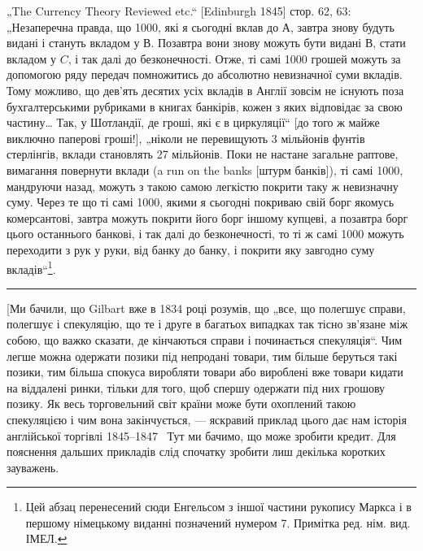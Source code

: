 „The Currency Theory Reviewed etc.“ [Edinburgh 1845] стор. 62, 63: „Незаперечна правда, що 1000, які я сьогодні вклав до $А$, завтра
знову будуть видані і стануть вкладом у $В$. Позавтра вони знову можуть бути
видані $В$, стати вкладом у $C$, і так далі до безконечності. Отже, ті самі
1000 грошей можуть за допомогою ряду передач помножитись до абсолютно невизначної
суми вкладів. Тому можливо, що дев’ять десятих усіх вкладів в Англії зовсім не існують поза
бухгалтерськими рубриками
в книгах банкірів, кожен з яких відповідає за свою частину\dots{} Так, у Шотландії, де гроші, які є в
циркуляції“ [до того ж майже виключно паперові гроші!],
„ніколи не перевищують 3 мільйонів фунтів стерлінгів, вклади становлять 27 мільйонів.
Поки не настане загальне раптове, вимагання повернути вклади (a run
on the banks [штурм банків]), ті самі 1000, мандруючи
назад, можуть з такою самою легкістю покрити таку ж невизначну суму.
Через те що ті самі 1000, якими я сьогодні покриваю свій
борг якомусь комерсантові, завтра можуть покрити його борг іншому купцеві,
а позавтра борг цього останнього банкові, і так далі до безконечності, то ті ж
самі 1000 можуть переходити з рук у руки, від банку до
банку, і покрити яку завгодно суму вкладів“\footnote*{
Цей абзац перенесений сюди Енгельсом з іншої частини рукопису Маркса і в першому німецькому
виданні позначений нумером 7. Примітка ред. нім. вид. ІМЕЛ.
}.

\pfbreak{}

[Ми бачили, що Gilbart вже в 1834 році розумів, що „все,
що полегшує справи, полегшує і спекуляцію, що те і друге
в багатьох випадках так тісно зв’язане між собою, що важко
сказати, де кінчаються справи і починається спекуляція“. Чим
легше можна одержати позики під непродані товари, тим більше
беруться такі позики, тим більша спокуса виробляти товари або
вироблені вже товари кидати на віддалені ринки, тільки для того,
щоб спершу одержати під них грошову позику. Як весь торговельний світ країни може бути охоплений
такою спекуляцією
і чим вона закінчується, — яскравий приклад цього дає нам історія
англійської торгівлі 1845--1847~ Тут ми бачимо, що може зробити кредит. Для пояснення дальших
прикладів слід спочатку
зробити лиш декілька коротких зауважень.

